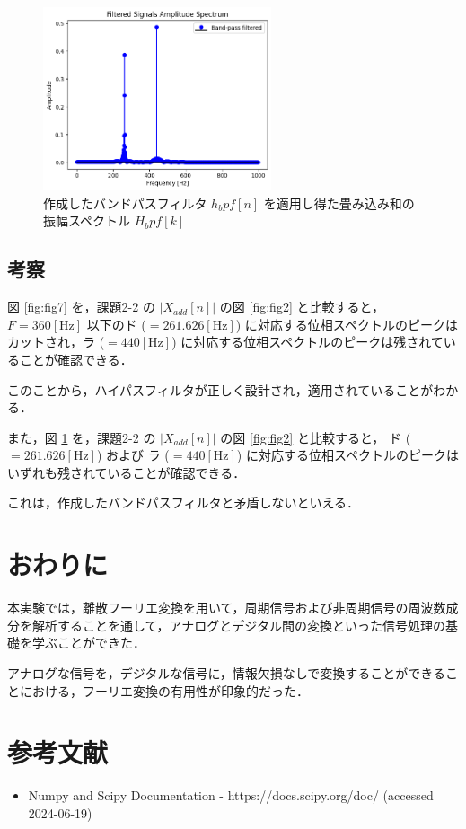 \documentclass[fleqn, a4paper. 12pt]{jsarticle}
\begin{document}
    \begin{figure}[!h]
      \centering
      \includegraphics[width=0.6\textwidth]{fig_27.png}
      \caption{作成したバンドパスフィルタ $h_bpf[n]$ を適用し得た畳み込み和の振幅スペクトル $H_bpf[k]$}
      \label{fig:fig8}
    \end{figure}
  
    \subsection*{考察}
    
      図 \ref{fig:fig7} を，課題2-2 の $|X_{add}[n]|$ の図 \ref{fig:fig2} と比較すると， $F = 360 [\mathrm{Hz}]$ 以下のド ($ = 261.626 [\mathrm{Hz}]$) に対応する位相スペクトルのピークはカットされ，ラ ($ = 440 [\mathrm{Hz}]$) に対応する位相スペクトルのピークは残されていることが確認できる．
  
      このことから，ハイパスフィルタが正しく設計され，適用されていることがわかる．

      また，図 \ref{fig:fig8} を，課題2-2 の $|X_{add}[n]|$ の図 \ref{fig:fig2} と比較すると， ド ($ = 261.626 [\mathrm{Hz}]$) および ラ ($ = 440 [\mathrm{Hz}]$) に対応する位相スペクトルのピークはいずれも残されていることが確認できる．

      これは，作成したバンドパスフィルタと矛盾しないといえる．

  \section*{おわりに}

    本実験では，離散フーリエ変換を用いて，周期信号および非周期信号の周波数成分を解析することを通して，アナログとデジタル間の変換といった信号処理の基礎を学ぶことができた．

    アナログな信号を，デジタルな信号に，情報欠損なしで変換することができることにおける，フーリエ変換の有用性が印象的だった．

  \newpage
  
  \section*{参考文献}

    \begin{itemize}
        \item Numpy and Scipy Documentation - https://docs.scipy.org/doc/ (accessed 2024-06-19)
    \end{itemize}
\end{document}
